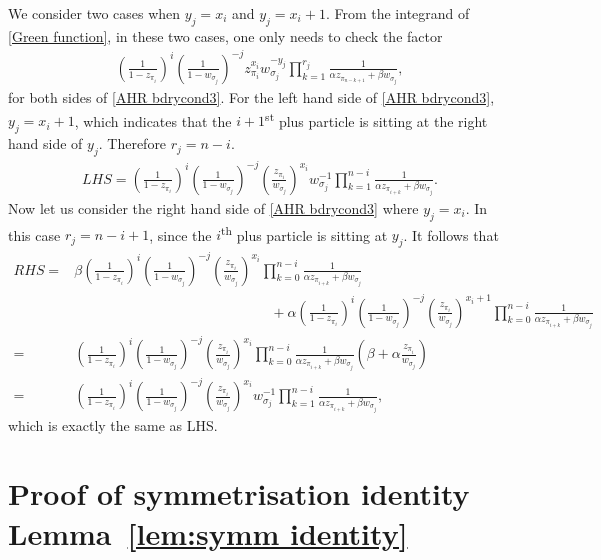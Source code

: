 \documentclass[cmp]{svjour}
\numberwithin{theorem}{section}
\numberwithin{equation}{section}
\begin{document}
We consider two cases when $y_j=x_i$ and $y_j=x_i+1$. From the integrand of \eqref{Green function}, in these two cases, one only needs to check the factor
\begin{align*}
\left(\frac{1}{1-z_{\pi_i}}\right)^i
\left(\frac{1}{1-w_{\sigma_j}}\right)^{-j}
z_{\pi_i}^{x_i}w_{\sigma_j}^{-y_j}
\prod_{k=1}^{r_j}
\frac{1}{\alpha z_{\pi_{n-k+1}} + \beta w_{\sigma_j}},
\end{align*}
for both sides of \eqref{AHR bdrycond3}. For the left hand side of \eqref{AHR bdrycond3}, $y_j=x_i+1$, which indicates that the $i+1$\textsuperscript{st} plus particle is sitting at the right hand side of $y_j$. Therefore $r_j=n-i$.
\begin{align*}
LHS
=
\left(\frac{1}{1-z_{\pi_i}}\right)^i
\left(\frac{1}{1-w_{\sigma_j}}\right)^{-j}
\left(\frac{z_{\pi_i}}{w_{\sigma_j}}\right)^{x_i}
w_{\sigma_j}^{-1}
\prod_{k=1}^{n-i}
\frac{1}{\alpha z_{\pi_{i+k}}+ \beta w_{\sigma_j}}.
\end{align*}
Now let us consider the right hand side of \eqref{AHR bdrycond3} where $y_j=x_i$. In this case $r_j=n-i+1$, since the $i$\textsuperscript{th} plus particle is sitting at $y_j$. It follows that
\begin{align*}
RHS
=&
\beta
\left(\frac{1}{1-z_{\pi_i}}\right)^i
\left(\frac{1}{1-w_{\sigma_j}}\right)^{-j}
\left(\frac{z_{\pi_i}}{w_{\sigma_j}}\right)^{x_i}
\prod_{k=0}^{n-i}
\frac{1}{\alpha z_{\pi_{i+k}}+ \beta w_{\sigma_j}}
\\
&\qquad\qquad\qquad\qquad\qquad\qquad\qquad
+ \alpha \left(\frac{1}{1-z_{\pi_i}}\right)^i
\left(\frac{1}{1-w_{\sigma_j}}\right)^{-j}
\left(\frac{z_{\pi_i}}{w_{\sigma_j}}\right)^{x_i+1}
\prod_{k=0}^{n-i}
\frac{1}{\alpha z_{\pi_{i+k}}+\beta w_{\sigma_j}}
\\
=&
\left(\frac{1}{1-z_{\pi_i}}\right)^i
\left(\frac{1}{1-w_{\sigma_j}}\right)^{-j}
\left(\frac{z_{\pi_i}}{w_{\sigma_j}}\right)^{x_i}
\prod_{k=0}^{n-i}
\frac{1}{\alpha z_{\pi_{i+k}}+ \beta w_{\sigma_j}}
\left(\beta + \alpha \frac{z_{\pi_i}}{w_{\sigma_j}}\right)
\\
=&
\left(\frac{1}{1-z_{\pi_i}}\right)^i
\left(\frac{1}{1-w_{\sigma_j}}\right)^{-j}
\left(\frac{z_{\pi_i}}{w_{\sigma_j}}\right)^{x_i}
w_{\sigma_j}^{-1}
\prod_{k=1}^{n-i}
\frac{1}{\alpha z_{\pi_{i+k}}+\beta w_{\sigma_j}},
\end{align*}
which is exactly the same as LHS.


\section{Proof of symmetrisation identity Lemma~\ref{lem:symm identity}}
\label{se:symm identities}
\end{document}
